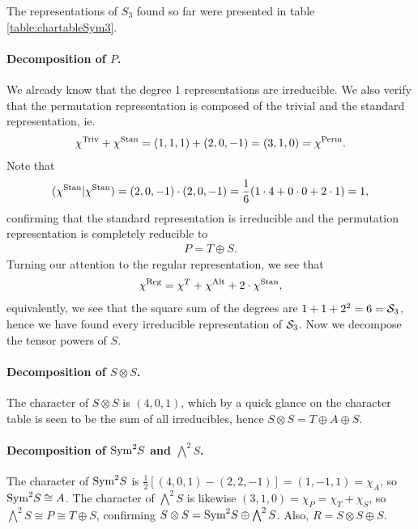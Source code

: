 \begin{example}
	The representations of $S_3$ found so far were presented in table \ref{table:chartableSym3}.
	
	\paragraph{Decomposition of $P$.} We already know that the degree 1 representations are irreducible. We also verify that the permutation representation is composed of the trivial and the standard representation, ie.
	\begin{align*}
		\chi^{\text{Triv}} + \chi^{\text{Stan}} = (1,1,1) + (2,0,-1) = (3,1,0) = \chi^{\text{Perm}}.
	\end{align*}
	Note that
	\begin{align*}
		(\chi^{\text{Stan}}|\chi^{\text{Stan}}) = (2,0,-1)\cdot (2,0,-1) = \frac{1}{6}(1 \cdot 4 + 0 \cdot 0 + 2\cdot 1) = 1,
	\end{align*}
	confirming that the standard representation is irreducible and the permutation representation is completely reducible to 
	\begin{align*}
		P = T \oplus S.
	\end{align*}
	Turning our attention to the regular representation, we see that 
	\begin{align*}
		\chi^{\text{Reg}} = \chi^T + \chi^{\text{Alt}} + 2 \cdot \chi^{\text{Stan}},
	\end{align*}
	equivalently, we see that the square sum of the degrees are $1 + 1 +2^2 = 6 = \mathcal{S}_3$, hence we have found every irreducible representation of $\mathcal{S}_3$. Now we decompose the tensor powers of $S$.
		
	\paragraph{Decomposition of $S \otimes S$.} The character of $S \otimes S$ is $(4,0,1)$, which by a quick glance on the character table is seen to be the sum of all irreducibles, hence $S \otimes S = T \oplus A \oplus S$.
	
	\paragraph{Decomposition of $\text{Sym}^2S$ and $\bigwedge^2S$.} The character of $\text{Sym}^2S$ is $\frac{1}{2}\left[ (4,0,1) - (2,2,-1) \right] = (1,-1,1) = \chi_A$, so $\text{Sym}^2S \cong A$. The character of $\bigwedge^2S$ is likewise $(3,1,0) = \chi_P = \chi_T + \chi_S$, so $\bigwedge^2S \cong P \cong T \oplus S$, confirming $S \otimes S = \text{Sym}^2S \oplus \bigwedge^2S$. Also, $R = S \otimes S \oplus S$.
	

\end{example}
